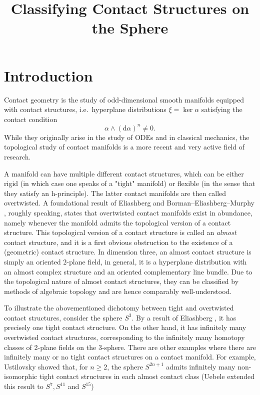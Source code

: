 \documentclass{amsart}
\renewcommand*{\d}{\mathrm{d}}
\begin{document}
\title{Classifying Contact Structures on the Sphere}
\address{}
\date{}

\maketitle
\section*{Introduction}
Contact geometry is the study of odd-dimensional smooth manifolds equipped with contact structures, i.e.\ hyperplane distributions $\xi = \ker \alpha$ satisfying the contact condition
\[
    \alpha \wedge (\d \alpha)^n \neq 0.
\]
While they originally arise in the study of ODEs and in classical mechanics, the topological study of contact manifolds is a more recent and very active field of research.

A manifold can have multiple different contact structures, which can be either rigid (in which case one speaks of a "tight" manifold) or flexible (in the sense that they satisfy an h-principle). The latter contact manifolds are then called overtwisted. A foundational result of Eliashberg \cite{Eliashberg89} and Borman--Eliashberg--Murphy \cite{BEM15}, roughly speaking, states that overtwisted contact manifolds exist in abundance, namely whenever the manifold admits the topological version of a contact structure.
This topological version of a contact structure is called an \emph{almost} contact structure, and it is a first obvious obstruction to the existence of a (geometric) contact structure. 
In dimension three, an almost contact structure is simply an oriented $2$-plane field,
in general, it is a hyperplane distribution with an almost complex structure
and an oriented complementary line bundle.
Due to the topological nature of almost contact structures, they can be classified
by methods of algebraic topology and are hence comparably well-understood.

To illustrate the abovementioned dichotomy between tight and overtwisted contact structures, consider the sphere $S^3$. By a result of Eliashberg \cite{Eliashberg92}, it has precisely one tight contact structure. On the other hand, it has infinitely many overtwisted contact structures, corresponding to the infinitely many homotopy classes of 2-plane fields on the 3-sphere. There are other examples where there are infinitely many or no tight contact structures on a contact manifold.
For example, Ustilovsky \cite{Ustilovsky99} showed that, for $n \geq 2$, the sphere 
$S^{2n+1}$ admits infinitely many non-isomorphic tight contact structures in each almost 
contact class (Uebele \cite{Uebele16} extended this result to $S^7, S^{11}$ and $S^{15}$)
\end{document}
